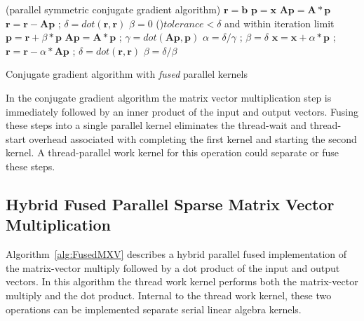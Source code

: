 \begin{algorithm}[h]
\SetAlgoLined
\DontPrintSemicolon
\Begin(parallel symmetric conjugate gradient algorithm){
$\mathbf{r} = \mathbf{b}$  \;
$\mathbf{p} = \mathbf{x}$  \;
$\mathbf{Ap} = \mathbf{A} * \mathbf{p}$  \;
$\mathbf{r} = \mathbf{r} - \mathbf{Ap}$ ; $\delta = dot(\mathbf{r},\mathbf{r})$  \;
$\beta = 0 $  \;
\While(){$\mathit{tolerance} < \delta$ and within iteration limit }{
  $\mathbf{p} = \mathbf{r} + \beta * \mathbf{p}$  \;
  $\mathbf{Ap} = \mathbf{A} * \mathbf{p}$ ; $\gamma = dot(\mathbf{Ap},\mathbf{p}) $  \;
  $\alpha = \delta / \gamma $ ; $\beta = \delta $  \;
  $\mathbf{x} = \mathbf{x} + \alpha * \mathbf{p}$ ; $\mathbf{r} = \mathbf{r}- \alpha * \mathbf{Ap}$ ; $\delta = dot(\mathbf{r},\mathbf{r})$  \;
  $\beta = \delta / \beta$  \;
}
}
\caption{Conjugate gradient algorithm with \emph{fused} parallel kernels}
\label{alg:CG-fused}
\end{algorithm}


In the conjugate gradient algorithm the matrix vector multiplication step is immediately followed by an inner product of the input and output vectors.
%
Fusing these steps into a single parallel kernel eliminates the thread-wait and thread-start overhead associated with completing the first kernel and starting the second kernel.
%
A thread-parallel work kernel for this operation could separate or fuse these steps.


\clearpage

\subsection{Hybrid Fused Parallel Sparse Matrix Vector Multiplication}

Algorithm~\ref{alg:FusedMXV} describes a hybrid parallel fused implementation of the matrix-vector multiply followed by a dot product of the input and output vectors.
%
In this algorithm the thread work kernel performs both the matrix-vector multiply and the dot product.
%
Internal to the thread work kernel, these two operations can be implemented separate serial linear algebra kernels.


